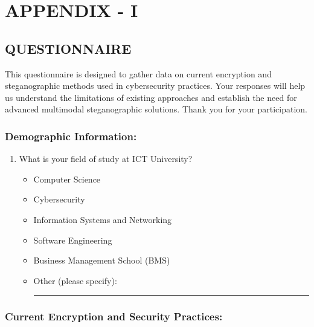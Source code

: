 \documentclass[12pt, a4paper, oneside]{book}
\begin{document}
\chapter{APPENDIX - I}

\section*{QUESTIONNAIRE}

This questionnaire is designed to gather data on current encryption and steganographic methods used in cybersecurity practices. Your responses will help us understand the limitations of existing approaches and establish the need for advanced multimodal steganographic solutions. Thank you for your participation.

\subsection*{Demographic Information:}

\begin{enumerate}
    \item What is your field of study at ICT University?
    \begin{itemize}
        \item Computer Science
        \item Cybersecurity
        \item Information Systems and Networking
        \item Software Engineering
        \item Business Management School (BMS)
        \item Other (please specify): \rule{3cm}{0.4pt}
    \end{itemize}
\end{enumerate}

\subsection*{Current Encryption and Security Practices:}
\end{document}
